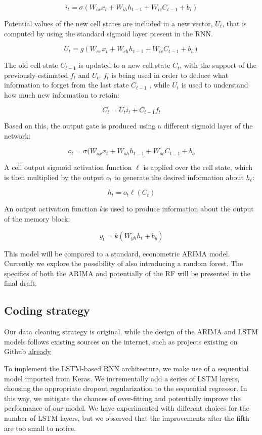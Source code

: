 \documentclass[10pt,twocolumn,letterpaper]{article}
\begin{document}
$$i_t=\sigma(W_{ix}x_t+W_{ih}h_{t-1}+W_{ic}C_{t-1}+b_i)$$

Potential values of the new cell states are included in a new vector, $U_t$, that is computed by using the standard sigmoid layer present in the RNN.

$$U_t=g(W_{cx}x_t+W_{ch}h_{t-1}+W_{ic}C_{t-1}+b_i) $$

The old cell state $C_{t−1}$ is updated to a new cell state $C_t$, with the support of the previously-estimated $f_t$ and $U_t$. $f_t$ is being used in order to deduce what  information to forget from the last state $C_{t−1}$ , while $U_t$ is used to understand how much new information to retain:

$$C_t=U_ti_t+C_{t-1}f_t $$

Based on this, the output gate is produced using a different sigmoid layer of the network:

$$o_t=\sigma(W_{ox}x_t+W_{oh}h_{t-1}+W_{oc}C_{t-1}+b_o$$

A cell output sigmoid activation function $\ell$ is applied over the cell state, which is then multiplied by the output $o_t$ to generate the desired information about $h_t$:

$$h_t=o_t \ell(C_t) $$

An output activation function $k$is used to produce information about the output of the memory block:

$$y_t=k(W_{yh}h_t+b_y)$$

This model will be compared to a standard, econometric ARIMA model. Currently we explore the possibility of also introducing a random forest. The specifics of both the ARIMA and potentially of the RF will be presented in the final draft.

\subsection{Coding strategy}

Our data cleaning strategy is original, while the design of the ARIMA and LSTM models follows existing sources on the internet, such as projects existing on Github \href{https://github.com/drwiiche/electricity-consumption}{already}

To implement the LSTM-based RNN architecture, we make use of a sequential model imported from Keras. We incrementally add a series of LSTM layers, choosing the appropriate dropout regularization to the sequential regressor. In this way, we mitigate the chances of over-fitting and potentially improve the performance of our model. We have experimented with different choices for the number of LSTM layers, but we observed that the improvements after the fifth are too small to notice. 
\end{document}
